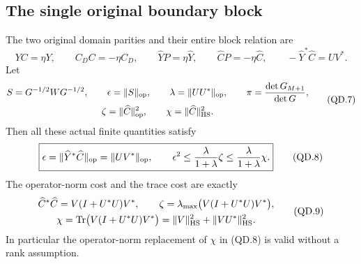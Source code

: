 \subsection{The single original boundary block}

\begin{theorem}
The two original domain parities and their entire block relation are
\[
 YC=\eta Y,\qquad C_DC=-\eta C_D,\qquad
 \widehat YP=\eta\widehat Y,\qquad
 \widehat CP=-\eta\widehat C,\qquad
 -\widehat Y^*\widehat C=UV^*.                              \tag{QD.6}
\]
Let
\[
 \begin{gathered}
 S=G^{-1/2}WG^{-1/2},\qquad \epsilon=\|S\|_{\rm op},\qquad
 \lambda=\|UU^*\|_{\rm op},\qquad
 \pi=\frac{\det G_{M+1}}{\det G},\\
 \zeta=\|\widehat C\|_{\rm op}^2,\qquad
 \chi=\|\widehat C\|_{\rm HS}^2.
 \end{gathered}                                                   \tag{QD.7}
\]
Then all these actual finite quantities satisfy
\[
 \boxed{\epsilon=\|\widehat Y^*\widehat C\|_{\rm op}
                    =\|UV^*\|_{\rm op},\qquad
 \epsilon^2\leq\frac{\lambda}{1+\lambda}\zeta
              \leq\frac{\lambda}{1+\lambda}\chi.}          \tag{QD.8}
\]
The operator-norm cost and the trace cost are exactly
\[
 \begin{gathered}
 \widehat C^*\widehat C=V(I+U^*U)V^*,\qquad
 \zeta=\lambda_{\max}\bigl(V(I+U^*U)V^*\bigr),\\
 \chi=\operatorname{Tr}\bigl(V(I+U^*U)V^*\bigr)
       =\|V\|_{\rm HS}^2+\|VU^*\|_{\rm HS}^2.
 \end{gathered}                                                   \tag{QD.9}
\]
In particular the operator-norm replacement of \(\chi\)
in (QD.8) is valid without a rank assumption.
\end{theorem}

